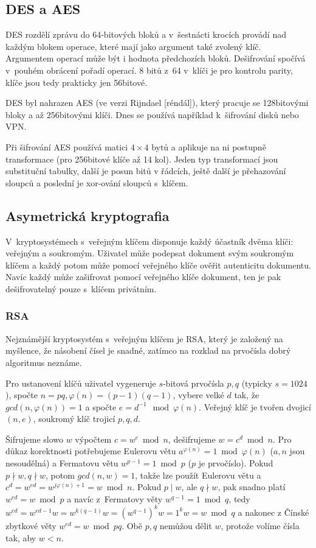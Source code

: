 \subsection{DES a AES}

DES rozdělí zprávu do 64-bitových bloků
a v~šestnácti krocích provádí nad každým blokem operace, které mají jako
argument také zvolený klíč. Argumentem operací může být i hodnota
předchozích bloků. Dešifrování spočívá v~pouhém obrácení pořadí operací.
8 bitů z~64 v~klíči je pro kontrolu parity, klíče jsou tedy prakticky
jen 56bitové.

DES byl nahrazen AES (ve verzi Rijndael [réndál]), který pracuje se
128bitovými bloky a až 256bitovými klíči. Dnes se používá například
k~šifrování disků nebo VPN.

Při šifrování AES používá matici $4 \times 4$ bytů a aplikuje na ni
postupně transformace (pro 256bitové klíče až 14 kol).
Jeden typ transformací jsou substituční tabulky,
další je posun bitů v řádcích,
ještě další je přehazování sloupců
a poslední je xor-ování sloupců s~klíčem.

\subsection{Asymetrická kryptografia}

V~kryptosystémech s~veřejným klíčem disponuje každý účastník dvěma
klíči: veřejným a soukromým. Uživatel může podepsat dokument svým
soukromým klíčem a každý potom může pomocí veřejného klíče ověřit
autenticitu dokumentu. Navíc každý může zašifrovat pomocí veřejného
klíče dokument, ten je pak dešifrovatelný pouze s~klíčem privátním.

\subsubsection{RSA}

Nejznámější kryptosystém s~veřejným klíčem je RSA, který je založený na
myšlence, že násobení čísel je snadné, zatímco na rozklad na prvočísla
dobrý algoritmus neznáme.

Pro ustanovení klíčů uživatel vygeneruje $s$-bitová prvočísla $p,q$
(typicky $s = 1024$), spočte $n = pq, \varphi(n) = (p-1)(q-1)$,
vybere velké $d$ tak, že $gcd(n, \varphi(n)) = 1$
a spočte $e = d^{-1} \mod \varphi(n)$. Veřejný klíč je tvořen dvojicí
$(n, e)$, soukromý klíč trojicí $p,q,d$.

Šifrujeme slowo $w$ výpočtem $c = w^e \bmod n$,
dešifrujeme $w = c^d \bmod n$.
Pro důkaz korektnosti potřebujeme Eulerovu větu $a^{\varphi(n)} = 1
\bmod \varphi(n)$ ($a,n$ jsou nesoudělná)
a Fermatovu větu $w^{p-1} = 1 \bmod p$ ($p$ je prvočíslo).
Pokud $p \nmid w, q \nmid w$, potom $gcd(n,w) = 1$, takže lze použít
Eulerovu větu a $c^d = w^{ed} = w^{j \varphi(n) + 1} = w \bmod n$.
Pokud $p \mid w$, ale $q \nmid w$,
pak snadno platí $w^{ed} = w \bmod p$
a navíc z~Fermatovy věty $w^{q-1} = 1 \bmod q$,
tedy
$w^{ed} = w^{ed - 1} w = w^{k(q-1)} w = (w^{q-1})^k w = 1^kw = w \bmod q$
a nakonec z Čínské zbytkové věty
$w^{ed} = w \bmod pq$.
Obě $p,q$ nemůžou dělit $w$, protože volíme čísla tak, aby $w < n$.


